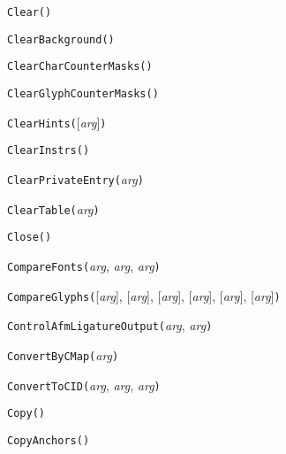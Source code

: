 
\noindent\texttt{Clear()}


\noindent\texttt{ClearBackground(}\texttt{)}


\noindent\texttt{ClearCharCounterMasks(}\texttt{)}


\noindent\texttt{ClearGlyphCounterMasks(}\texttt{)}


\noindent\texttt{ClearHints(}[\textit{arg}]\texttt{)}


\noindent\texttt{ClearInstrs(}\texttt{)}


\noindent\texttt{ClearPrivateEntry(}\textit{arg}\texttt{)}


\noindent\texttt{ClearTable(}\textit{arg}\texttt{)}


\noindent\texttt{Close(}\texttt{)}


\noindent\texttt{CompareFonts(}\textit{arg}, \textit{arg}, \textit{arg}\texttt{)}


\noindent\texttt{CompareGlyphs(}[\textit{arg}], [\textit{arg}], [\textit{arg}], [\textit{arg}], [\textit{arg}], [\textit{arg}]\texttt{)}


\noindent\texttt{ControlAfmLigatureOutput(}\textit{arg}, \textit{arg}\texttt{)}


\noindent\texttt{ConvertByCMap(}\textit{arg}\texttt{)}


\noindent\texttt{ConvertToCID(}\textit{arg}, \textit{arg}, \textit{arg}\texttt{)}


\noindent\texttt{Copy(}\texttt{)}


\noindent\texttt{CopyAnchors(}\texttt{)}

